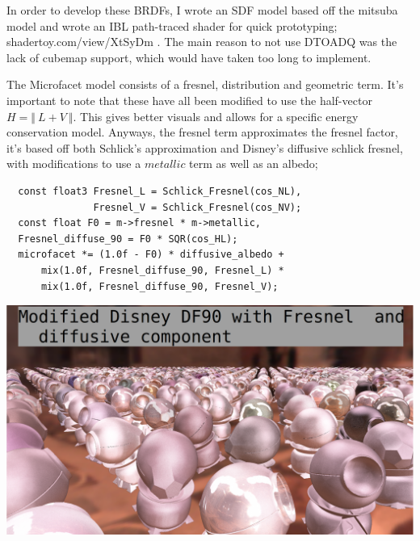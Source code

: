 \message{ !name(test.tex)}\documentclass{article}
\begin{document}
  In order to develop these BRDFs, I wrote an SDF model based off the mitsuba
model and wrote an IBL path-traced shader for quick prototyping;
shadertoy.com/view/XtSyDm . The main reason to not use DTOADQ was the lack of
cubemap support, which would have taken too long to implement.
  
  The Microfacet model consists of a fresnel, distribution and geometric term.
It's important to note that these have all been modified to use the half-vector
$H = \Vert\:L+V\:\Vert$. This gives better visuals and allows for a specific
energy conservation model. Anyways, the fresnel term approximates the fresnel
factor, it's based off both Schlick's approximation and Disney's diffusive
schlick fresnel, with modifications to use a $metallic$ term as well as an
albedo;
  \begin{lstlisting}
  const float3 Fresnel_L = Schlick_Fresnel(cos_NL),
               Fresnel_V = Schlick_Fresnel(cos_NV);
  const float F0 = m->fresnel * m->metallic,
  Fresnel_diffuse_90 = F0 * SQR(cos_HL);
  microfacet *= (1.0f - F0) * diffusive_albedo +
      mix(1.0f, Fresnel_diffuse_90, Fresnel_L) *
      mix(1.0f, Fresnel_diffuse_90, Fresnel_V);
  \end{lstlisting}
  \includegraphics[scale=0.20]{fresnel}
  
\end{document}
